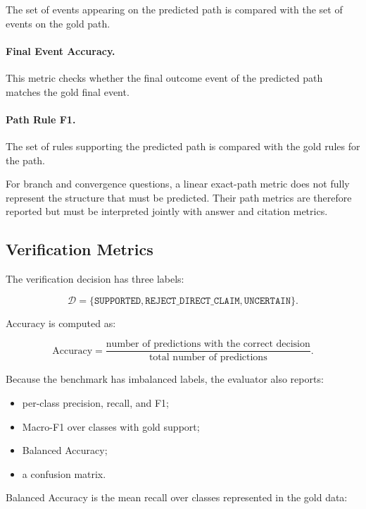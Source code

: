 The set of events appearing on the predicted path is compared with the set of
events on the gold path.

\paragraph{Final Event Accuracy.}

This metric checks whether the final outcome event of the predicted path
matches the gold final event.

\paragraph{Path Rule F1.}

The set of rules supporting the predicted path is compared with the gold rules
for the path.

For branch and convergence questions, a linear exact-path metric does not fully
represent the structure that must be predicted. Their path metrics are
therefore reported but must be interpreted jointly with answer and citation
metrics.

\subsection{Verification Metrics}

The verification decision has three labels:

\[
\mathcal{D}
=
\{
\texttt{SUPPORTED},
\texttt{REJECT\_DIRECT\_CLAIM},
\texttt{UNCERTAIN}
\}.
\]

Accuracy is computed as:

\begin{equation}
\mathrm{Accuracy}
=
\frac{
    \text{number of predictions with the correct decision}
}{
    \text{total number of predictions}
}.
\end{equation}

Because the benchmark has imbalanced labels, the evaluator also reports:

\begin{itemize}
    \item per-class precision, recall, and F1;
    \item Macro-F1 over classes with gold support;
    \item Balanced Accuracy;
    \item a confusion matrix.
\end{itemize}

Balanced Accuracy is the mean recall over classes represented in the gold
data:

